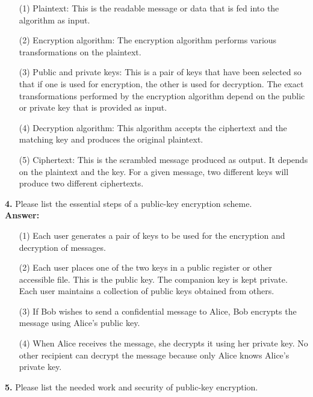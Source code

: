 \documentclass[paper=a4, fontsize=11pt]{scrartcl} %
\numberwithin{equation}{section} %
\numberwithin{figure}{section} %
\numberwithin{table}{section} %
\begin{document}
 \begin{enumerate}
 \item[(1)] Plaintext: This is the readable message or data that is fed into the algorithm as input.
 \item[(2)] Encryption algorithm: The encryption algorithm performs various transformations on the plaintext.
 \item[(3)] Public and private keys: This is a pair of keys that have been selected so that if one is used for encryption, the other is used for decryption. The exact transformations performed by the encryption algorithm depend on the public or private key that is provided as input.
 \item[(4)] Decryption algorithm: This algorithm accepts the ciphertext and the matching key and produces the original plaintext.
 \item[(5)] Ciphertext: This is the scrambled message produced as output. It depends on the plaintext and the key. For a given message, two different keys will produce two different ciphertexts.\\
 \end{enumerate}



 \textbf{4.} Please list the essential steps of a public-key encryption scheme.\\

 \textbf{Answer:}

 \begin{enumerate}
 \item[(1)] Each user generates a pair of keys to be used for the encryption and decryption of messages.
 \item[(2)] Each user places one of the two keys in a public register or other accessible file. This is the public key. The companion key is kept private. Each user maintains a collection of public keys obtained from others.
 \item[(3)] If Bob wishes to send a confidential message to Alice, Bob encrypts the message using Alice's public key.
 \item[(4)] When Alice receives the message, she decrypts it using her private key. No other recipient can decrypt the message because only Alice knows Alice's private key.\\
 \end{enumerate}



 \textbf{5.} Please list the needed work and security of public-key encryption.\\
\end{document}

